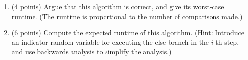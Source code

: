 \documentclass[11pt]{article}
\begin{document}
\begin{enumerate}

\item (4 points) Argue that this algorithm is correct, and give its worst-case
    runtime. (The runtime is proportional to the number of comparisons made.)

\item (6 points) Compute the expected runtime of this algorithm.  (Hint:
    Introduce an indicator random variable for executing the else branch in the
        $i$-th step, and use backwards analysis to simplify the analysis.)

\end{enumerate}
\answer
\end{document}
